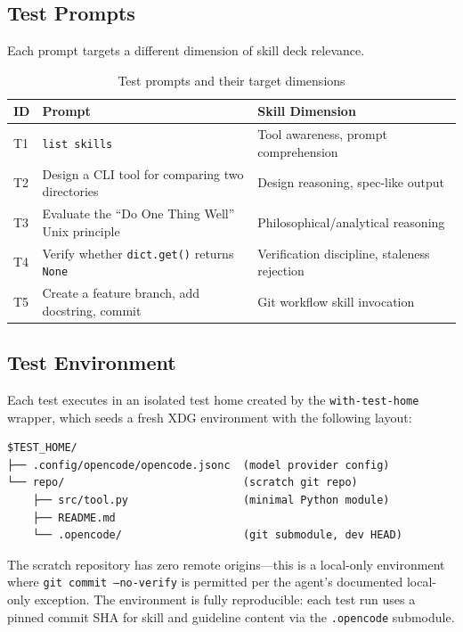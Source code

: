 \documentclass[11pt,a4paper]{article}
\begin{document}
\subsection{Test Prompts}

Each prompt targets a different dimension of skill deck relevance.

\begin{table}[H]
\centering
\begin{tabular}{lll}
\toprule
ID & Prompt & Skill Dimension \\
\midrule
T1 & \texttt{list skills} & Tool awareness, prompt comprehension \\
T2 & Design a CLI tool for comparing two directories & Design reasoning, spec-like output \\
T3 & Evaluate the ``Do One Thing Well'' Unix principle & Philosophical/analytical reasoning \\
T4 & Verify whether \texttt{dict.get()} returns \texttt{None} & Verification discipline, staleness rejection \\
T5 & Create a feature branch, add docstring, commit & Git workflow skill invocation \\
\bottomrule
\end{tabular}
\caption{Test prompts and their target dimensions}
\end{table}

\subsection{Test Environment}

Each test executes in an isolated test home created by the \texttt{with-test-home} wrapper, which seeds a fresh XDG environment with the following layout:

\begin{verbatim}
$TEST_HOME/
├── .config/opencode/opencode.jsonc  (model provider config)
└── repo/                            (scratch git repo)
    ├── src/tool.py                  (minimal Python module)
    ├── README.md
    └── .opencode/                   (git submodule, dev HEAD)
\end{verbatim}

The scratch repository has zero remote origins—this is a local-only environment where \texttt{git commit --no-verify} is permitted per the agent's documented local-only exception. The environment is fully reproducible: each test run uses a pinned commit SHA for skill and guideline content via the \texttt{.opencode} submodule.
\end{document}
